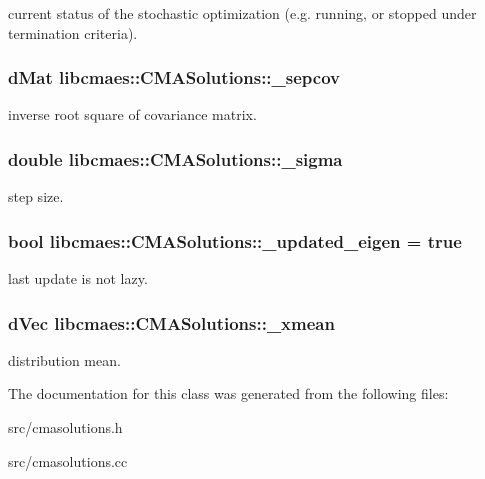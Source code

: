 current status of the stochastic optimization (e.\-g. running, or stopped under termination criteria). \hypertarget{classlibcmaes_1_1CMASolutions_a2ae1e479582128f96be7a39ac6db57dd}{
\subsubsection[{\-\_\-sepcov}]{\setlength{\rightskip}{0pt plus 5cm}d\-Mat libcmaes\-::\-C\-M\-A\-Solutions\-::\-\_\-sepcov}}\label{classlibcmaes_1_1CMASolutions_a2ae1e479582128f96be7a39ac6db57dd}
inverse root square of covariance matrix. \hypertarget{classlibcmaes_1_1CMASolutions_ac05a959d23279c36c0cff46f361d73e5}{
\subsubsection[{\-\_\-sigma}]{\setlength{\rightskip}{0pt plus 5cm}double libcmaes\-::\-C\-M\-A\-Solutions\-::\-\_\-sigma}}\label{classlibcmaes_1_1CMASolutions_ac05a959d23279c36c0cff46f361d73e5}
step size. \hypertarget{classlibcmaes_1_1CMASolutions_a1962eb8dde999aa46d8e89689298bc3e}{
\subsubsection[{\-\_\-updated\-\_\-eigen}]{\setlength{\rightskip}{0pt plus 5cm}bool libcmaes\-::\-C\-M\-A\-Solutions\-::\-\_\-updated\-\_\-eigen = true}}\label{classlibcmaes_1_1CMASolutions_a1962eb8dde999aa46d8e89689298bc3e}
last update is not lazy. \hypertarget{classlibcmaes_1_1CMASolutions_a206048105c382882cb4ec3f85e3b15af}{
\subsubsection[{\-\_\-xmean}]{\setlength{\rightskip}{0pt plus 5cm}d\-Vec libcmaes\-::\-C\-M\-A\-Solutions\-::\-\_\-xmean}}\label{classlibcmaes_1_1CMASolutions_a206048105c382882cb4ec3f85e3b15af}
distribution mean. 

The documentation for this class was generated from the following files\-:\begin{DoxyCompactItemize}
\item 
src/cmasolutions.\-h\item 
src/cmasolutions.\-cc\end{DoxyCompactItemize}
